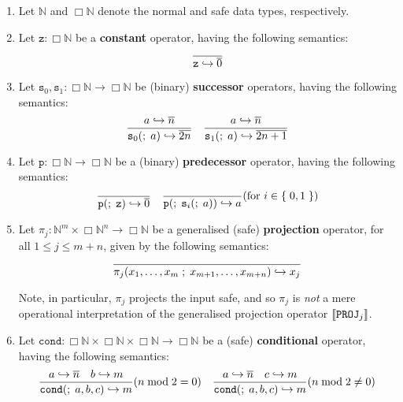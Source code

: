 \begin{definition} \cite{bellantoni-cook-1992}

\begin{enumerate}[label=(\arabic*)]

\item Let $\mathbb{N}$ and $\Box\mathbb{N}$ denote the normal and safe data
types, respectively.

\item Let $\mathtt{z} : \Box\mathbb{N}$ be a \textbf{constant} operator, having
the following semantics:$$
%
\axiom{ \mathtt{z} \goesto \repr{0} }
%
$$

\item Let $\mathtt{s}_0,\mathtt{s}_1 : \Box\mathbb{N} \rightarrow
\Box\mathbb{N}$ be (binary) \textbf{successor} operators, having the following
semantics:$$
%
\judgement{ a \goesto \repr{n} }{
%
  \mathtt{s}_0\p{\semic{} a} \goesto \repr{2n}
%
} \quad
%
\judgement{ a \goesto \repr{n} }{
%
  \mathtt{s}_1\p{\semic{} a} \goesto \repr{2n + 1}
%
}
%
$$

\item Let $\mathtt{p} : \Box\mathbb{N} \rightarrow \Box\mathbb{N}$ be a
(binary) \textbf{predecessor} operator, having the following semantics: $$
%
\axiom{
%
  \mathtt{p}\p{\semic{} \mathtt{z}} \goesto \repr{0}
%
}
%
\quad\axiom{
%
  \mathtt{p}\p{\semic{} \mathtt{s}_i\p{\semic{} a}} \goesto a
%
}\p{\text{for $i \in \set{0,1}$}}
%
$$

\item Let $\pi_j : \mathbb{N}^m \times \Box\mathbb{N}^n \rightarrow
\Box\mathbb{N}$ be a generalised (safe) \textbf{projection} operator, for all
$1 \leq j \leq m+n$, given by the following semantics:$$
%
\axiom{ \pi_j\p{x_1,\ldots,x_m \semic{} x_{m+1},\ldots,x_{m+n}} \goesto x_j }
%
$$

Note, in particular, $\pi_j$ projects the input safe, and so $\pi_j$ is
\emph{not} a mere operational interpretation of the generalised projection
operator ${\mathopen{}\left\llbracket{\mathtt{PROJ}_j}\right\rrbracket\mathclose{}}$.

\item Let $\mathtt{cond} : \Box\mathbb{N} \times \Box\mathbb{N} \times
\Box\mathbb{N} \rightarrow \Box\mathbb{N}$ be a (safe) \textbf{conditional}
operator, having the following semantics:$$
%
\judgement{
%
  a \goesto \repr{n} \quad b \goesto m
%
}{
%
  \mathtt{cond}\p{\semic{} a, b, c} \goesto m
%
}\p{n \bmod 2 = 0}
%
\quad\judgement{
%
  a \goesto \repr{n} \quad c \goesto m
%
}{
%
  \mathtt{cond}\p{\semic{} a, b, c} \goesto m
%
}\p{n \bmod 2 \neq 0}
%
$$


\end{enumerate}
\end{definition}
